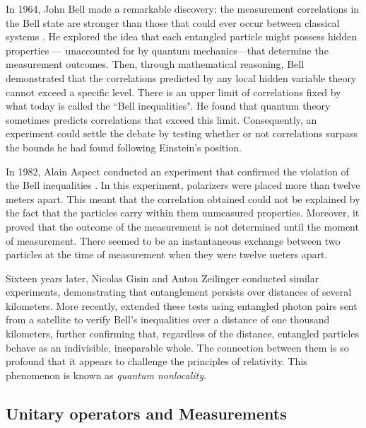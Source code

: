 In 1964, John Bell made a remarkable discovery: the measurement correlations in the Bell state are stronger than those that could ever occur between  classical systems \cite{bell1964einstein}. He explored the idea that each entangled particle might possess hidden properties — unaccounted for by quantum mechanics—that determine the measurement outcomes. Then, through mathematical reasoning, Bell demonstrated that the correlations predicted by any local hidden variable theory cannot exceed a specific level.  There is an upper limit of correlations fixed by what today is called the ``Bell inequalities". He found that quantum theory sometimes predicts correlations that exceed this limit. Consequently, an experiment could  settle the debate by testing whether or not correlations surpass the bounds he had found following Einstein's position.


In 1982, Alain Aspect conducted an experiment that confirmed the violation of the Bell inequalities \cite{aspect1982experimental}. In this experiment, polarizers were placed more than twelve meters apart. This meant that the correlation obtained could not be explained by the fact that the particles carry within them unmeasured properties. Moreover, it proved that the outcome of the measurement is not determined until the moment of measurement. There seemed to be an instantaneous exchange between two particles at the time of measurement when they were twelve meters apart.



Sixteen years later, Nicolas Gisin \cite{tittel1998experimental} and Anton Zeilinger \cite{pan1998experimental} conducted similar experiments, demonstrating that entanglement persists over distances of several kilometers. More recently,  \cite{yin2017satellite} extended these tests using entangled photon pairs sent from a satellite to verify Bell's inequalities over a distance of one thousand kilometers, further confirming that, regardless of the distance, entangled particles behave as an indivisible, inseparable whole. The connection between them is so profound that it appears to challenge the principles of relativity. This phenomenon is known as \emph{quantum nonlocality}.

\subsection{Unitary operators and Measurements}\label{subsec:unitary-operators&measurements}




